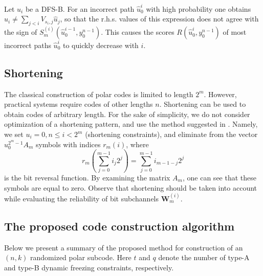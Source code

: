 \documentclass[conference]{IEEEtran}
\theoremstyle{plain}
\begin{document}
Let $u_i$ be a  DFS-B. For an incorrect path $\hat u_0^i$ with high probability one obtains $u_i\neq \sum_{j<i}V_{s_i,j}\hat u_j$, so that the r.h.s. values of this expression does not agree with the sign of $S_m^{(i)}(\hat u_0^{i-1},y_0^{n-1})$. This causes the scores  $R(\hat u_0^i,y_0^{n-1})$ of most incorrect paths $\hat u_0^{i}$ to quickly decrease with $i$. 


\subsection{Shortening}
The classical construction of polar codes is limited to length $2^m$. However, practical systems require codes of other lengths $n$. Shortening can be used to obtain codes of arbitrary length. For the sake of simplicity, we do not consider optimization of a shortening pattern, and use the method suggested in \cite{wang2014punctured}. Namely, we set $u_i=0, n\leq i<2^m$ (shortening constraints), and eliminate from the vector $u_0^{2^m-1}A_m$ symbols with indices $r_m(i)$, where $$r_m\left(\sum_{j=0}^{m-1}i_j2^j\right)=\sum_{j=0}^{m-1}i_{m-1-j}2^j$$
is the bit reversal function. By examining the matrix $A_m$, one can see that these symbols are equal to zero. Observe that shortening should be taken into account while evaluating the reliability of  bit subchannels $\mathbf W_m^{(i)}$.

\subsection{The proposed code construction algorithm}


Below we present a summary of the proposed method for construction of an $(n,k)$ randomized polar subcode. Here $t$ and $q$ denote the number of type-A and type-B dynamic freezing constraints, respectively.
\end{document}

